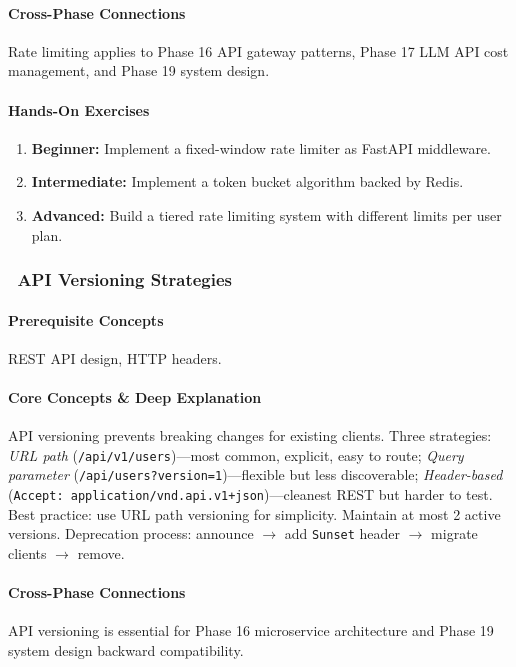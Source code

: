 \documentclass[11pt, a4paper, oneside]{report}
\newcommand{\awareness}[1]{\subsubsection{\texorpdfstring{\fcolorbox{gray!50}{gray!10}{\footnotesize\bfseries\color{gray!50!black} AWARENESS}~#1}{#1}}}
\newcommand{\arrow}{$\rightarrow$}
\begin{document}
\paragraph{Cross-Phase Connections} Rate limiting applies to Phase 16 API gateway patterns, Phase 17 LLM API cost management, and Phase 19 system design.

\paragraph{Hands-On Exercises}
\begin{enumerate}[leftmargin=*]
\item \textbf{Beginner:} Implement a fixed-window rate limiter as FastAPI middleware.
\item \textbf{Intermediate:} Implement a token bucket algorithm backed by Redis.
\item \textbf{Advanced:} Build a tiered rate limiting system with different limits per user plan.
\end{enumerate}


\awareness{API Versioning Strategies}

\paragraph{Prerequisite Concepts} REST API design, HTTP headers.

\paragraph{Core Concepts \& Deep Explanation} API versioning prevents breaking changes for existing clients. Three strategies: \emph{URL path} (\texttt{/api/v1/users})---most common, explicit, easy to route; \emph{Query parameter} (\texttt{/api/users?version=1})---flexible but less discoverable; \emph{Header-based} (\texttt{Accept: application/vnd.api.v1+json})---cleanest REST but harder to test. Best practice: use URL path versioning for simplicity. Maintain at most 2 active versions. Deprecation process: announce \arrow{} add \texttt{Sunset} header \arrow{} migrate clients \arrow{} remove.

\paragraph{Cross-Phase Connections} API versioning is essential for Phase 16 microservice architecture and Phase 19 system design backward compatibility.
\end{document}
